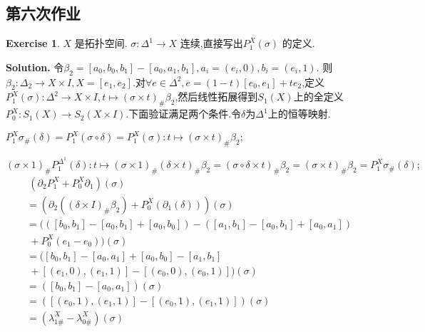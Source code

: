 \documentclass[a4paper]{book}
\newenvironment{solution}%
{\noindent\textbf{Solution.}}%
{\qedhere}
\numberwithin{equation}{chapter}
\theoremstyle{definition}
\newtheorem{exc}[exm]{Exercise}
\begin{document}
\begin{multicols}{2}
\section{第六次作业}
\begin{exc}
	$X$ 是拓扑空间. $\sigma : \Delta^1 \rightarrow X $ 连续,直接写出$ P^X_1(\sigma)$ 的定义.
\end{exc}

\begin{solution}
	令$ \beta_2 = [a_0, b_0, b_1] - [a_0, a_1, b_1], a_i = (e_i, 0),b_i = (e_i, 1) $.
	则$ \beta_2: \Delta_2 \rightarrow X \times I, X = [e_1, e_2] $.对$\forall e \in \Delta^2, e = (1 -t)[e_0, e_1] + t e_2 $,定义$ P^X_1(\sigma): \Delta^2 \rightarrow X \times I, t \mapsto (\sigma \times t)_\# \beta_2 $,然后线性拓展得到$ S_1(X) $上的全定义$ P^X_0: S_1(X) \rightarrow S_2(X \times I) $.下面验证满足两个条件.令$ \delta $为$ \Delta^1 $上的恒等映射.
	
	$ P^X_1 \sigma_\#(\delta) = P^X_1(\sigma \circ \delta) = P^X_1(\sigma): t \mapsto (\sigma \times t)_\# \beta_2 ; $
	
	$ (\sigma \times 1)_\# P^{\Delta^1}_1(\delta): t \mapsto (\sigma \times 1)_\# (\delta \times t)_\# \beta_2 = (\sigma \circ \delta \times t)_\# \beta_2 = (\sigma \times t)_\#\beta_2 = P^X_1 \sigma_\#(\delta);  $
	\begin{align*}
		&\ (\partial_2 P^X_1 + P^X_0 \partial_1)(\sigma) \\
		&= (\partial_2((\delta \times I)_\# \beta_2) + P^X_0(\partial_1(\delta)))(\sigma) \\
		&= (([b_0,b_1] - [a_0,b_1] + [a_0,b_0]) - ([a_1,b_1] - [a_0,b_1] + [a_0,a_1])\\& \ + P^X_0(e_1 - e_0))(\sigma) \\ 
		&= ([b_0,b_1] - [a_0,a_1] + [a_0,b_0] - [a_1,b_1] \\ &\ + [(e_1,0),(e_1,1)] - [(e_0,0), (e_0,1)])(\sigma) \\
		&= ([b_0,b_1] - [a_0,a_1])(\sigma) \\
		&= ([(e_0,1),(e_1,1)] - [(e_0,1), (e_1,1)])(\sigma) \\
		&= (\lambda^X_{1\#} - \lambda^X_{0\#})(\sigma)
	\end{align*}
\end{solution}
%

%

%


\end{multicols}
\end{document}

